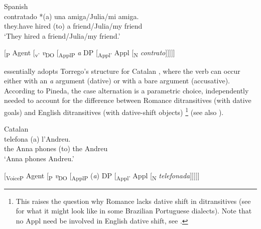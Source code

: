 \documentclass[output=paper,colorlinks,citecolor=brown,nonflat]{./langscibook}
\begin{document}
\ea%
    \label{ex:manzini:2}
    Spanish \citep{Torrego2010}\\
         {contratado}  {*(a)} {una} {amiga/Julia/mi} {amiga.}\\
        they.have   hired      (to) a friend/Julia/my friend\\
    \glt ‘They hired a friend/Julia/my friend.’
\z

\ea%
    \label{ex:manzini:3}{}
    [\textsubscript{\liv P} Agent [\textsubscript{v’} \textit{v}\textsubscript{DO} [\textsubscript{ApplP} \textit{a} DP [\textsubscript{Appl’} Appl [\textsubscript{N} \textit{contrato}]]]]]
\z

\citet[359--360]{Pineda2016} essentially adopts Torrego’s structure for Catalan , where the verb can occur either with an \textit{a} argument (dative) or with a bare argument (accusative). According to Pineda, the case alternation is a parametric choice, independently needed to account for the difference between Romance ditransitives (with dative goals) and English ditransitives (with dative-shift objects){} \footnote{This raises the question why Romance lacks dative shift in ditransitives (see \citealt{Lima-Salles2016} for what it might look like in some Brazilian Portuguese dialects). Note that no Appl need be involved in English dative shift, see \citet{Kayne1984, Pesetsky1995, Harley2002, BeckJohnson2004}.} (see also \citealt{Pineda2014}).

\ea%
    \label{ex:manzini:4}
    Catalan \citep{Pineda2016}\\
       {telefona}   {(a)} {l’Andreu}.\\
        {the Anna}   phones   (to) {the Andreu}\\
    \glt ‘Anna phones Andreu.’
\z

\ea%
    \label{ex:manzini:5}{}
    [\textsubscript{VoiceP}  Agent [\textsubscript{\liv P} \textit{v}\textsubscript{DO} [\textsubscript{ApplP} (\textit{a}) DP [\textsubscript{Appl’} Appl [\textsubscript{N} \textit{telefonada}]]]]]\\
\z
\end{document}
